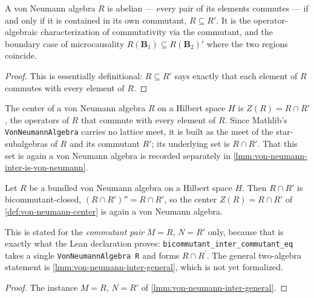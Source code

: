 \begin{lemma}
    \label{lmm:von-neumann-abelian-self-commuting}
    \leanok
    A von Neumann algebra $R$ is abelian --- every pair of its elements commutes --- if and only if it is contained in its own commutant, $R \subseteq R'$. It is the operator-algebraic characterization of commutativity via the commutant, and the boundary case of microcausality $R(\mathbf{B}_1) \subseteq R(\mathbf{B}_2)'$ where the two regions coincide.
\end{lemma}
\begin{proof}
    \leanok
    This is essentially definitional: $R \subseteq R'$ says exactly that each element of $R$ commutes with every element of $R$.
\end{proof}

\begin{definition}
    \label{def:von-neumann-center}
    \leanok
    The center of a von Neumann algebra $R$ on a Hilbert space $H$ is $Z(R) = R \cap R'$, the operators of $R$ that commute with every element of $R$. Since Mathlib's \texttt{VonNeumannAlgebra} carries no lattice meet, it is built as the meet of the star-subalgebras of $R$ and its commutant $R'$; its underlying set is $R \cap R'$. That this set is again a von Neumann algebra is recorded separately in \ref{lmm:von-neumann-inter-is-von-neumann}.
\end{definition}

\begin{lemma}
    \label{lmm:von-neumann-inter-is-von-neumann}
    \leanok
    Let $R$ be a bundled von Neumann algebra on a Hilbert space $H$. Then $R \cap R'$ is bicommutant-closed, $(R \cap R')'' = R \cap R'$, so the center $Z(R) = R \cap R'$ of \ref{def:von-neumann-center} is again a von Neumann algebra.

    This is stated for the \emph{commutant pair} $M = R$, $N = R'$ only, because that is exactly what the Lean declaration proves: \texttt{bicommutant\_inter\_commutant\_eq} takes a single \texttt{VonNeumannAlgebra R} and forms $R \cap R^{\prime}$. The general two-algebra statement is \ref{lmm:von-neumann-inter-general}, which is not yet formalized.
\end{lemma}
\begin{proof}
    \leanok
    The instance $M = R$, $N = R'$ of \ref{lmm:von-neumann-inter-general}.
\end{proof}

